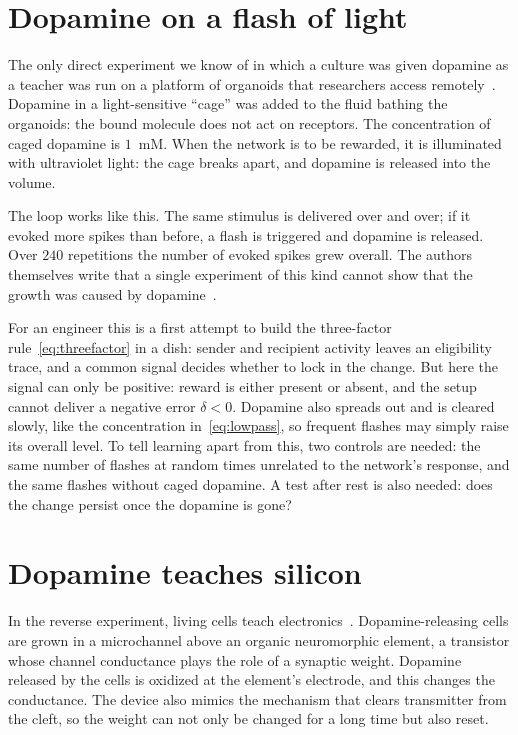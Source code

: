 \section{Dopamine on a flash of light}
\label{sec:dishdopamine}

The only direct experiment we know of in which a culture was given dopamine as a teacher was run on a platform of organoids that researchers access remotely~\cite{Jordan2024}. Dopamine in a light-sensitive ``cage'' was added to the fluid bathing the organoids: the bound molecule does not act on receptors. The concentration of caged dopamine is $1$~mM. When the network is to be rewarded, it is illuminated with ultraviolet light: the cage breaks apart, and dopamine is released into the volume.

The loop works like this. The same stimulus is delivered over and over; if it evoked more spikes than before, a flash is triggered and dopamine is released. Over $240$ repetitions the number of evoked spikes grew overall. The authors themselves write that a single experiment of this kind cannot show that the growth was caused by dopamine~\cite{Jordan2024}.

For an engineer this is a first attempt to build the three-factor rule~\eqref{eq:threefactor} in a dish: sender and recipient activity leaves an eligibility trace, and a common signal decides whether to lock in the change. But here the signal can only be positive: reward is either present or absent, and the setup cannot deliver a negative error $\delta<0$. Dopamine also spreads out and is cleared slowly, like the concentration in~\eqref{eq:lowpass}, so frequent flashes may simply raise its overall level. To tell learning apart from this, two controls are needed: the same number of flashes at random times unrelated to the network's response, and the same flashes without caged dopamine. A test after rest is also needed: does the change persist once the dopamine is gone?

\section{Dopamine teaches silicon}
\label{sec:biohybrid}

In the reverse experiment, living cells teach electronics~\cite{Keene2020}. Dopamine-releasing cells are grown in a microchannel above an organic neuromorphic element, a transistor whose channel conductance plays the role of a synaptic weight. Dopamine released by the cells is oxidized at the element's electrode, and this changes the conductance. The device also mimics the mechanism that clears transmitter from the cleft, so the weight can not only be changed for a long time but also reset.

